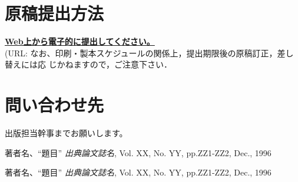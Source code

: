 \documentclass[11pt]{jarticle}
\begin{document}
\section{原稿提出方法}
\hspace{1.0em}
\underline{\bf Web上から電子的に提出してください。}\\
(URL: %
なお、印刷・製本スケジュールの関係上，提出期限後の原稿訂正，差し替えには応
じかねますので，ご注意下さい．

\section{問い合わせ先}
出版担当幹事までお願いします。

\vspace{13em}

\begin{thebibliography}{99}

 著者名、``題目''
{\em 出典論文誌名}, Vol. XX, No. YY, pp.ZZ1-ZZ2, Dec., 1996

 著者名、``題目''
{\em 出典論文誌名}, Vol. XX, No. YY, pp.ZZ1-ZZ2, Dec., 1996

\end{thebibliography}
\end{document}
